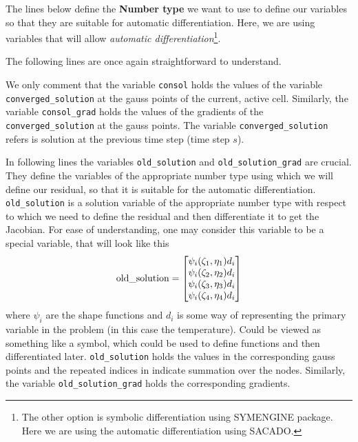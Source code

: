 \documentclass[preprint,12pt]{elsarticle}
\newcommand{\te}[1]{\lstinline{#1}}
\numberwithin{equation}{section}
\begin{document}
The lines below  define the \textbf{Number type} we want to use to define our variables so that they are suitable for automatic differentiation. Here, we are using variables that will allow \textit{automatic differentiation}\footnote{The other option is symbolic differentiation using SYMENGINE package. Here we are using the automatic differentiation using SACADO.}.  


The following lines are once again straightforward to understand. 

We only comment that the variable \te{consol} holds the values of the variable \te{converged_solution} at the gauss points of the current, active cell. Similarly, the variable \te{consol_grad} holds the values of the gradients of the \te{converged_solution} at the gauss points. The variable \te{converged_solution} refers is solution at the previous time step (time step $s$). 


In following lines the variables \te{old_solution} and \te{old_solution_grad} are 
crucial. They define the variables of the  appropriate number type using which we will define our residual, so that it is suitable for the automatic differentiation.  \te{old_solution} is a solution variable of the appropriate number type with respect to which we need to define the residual and then differentiate it to get the Jacobian. For ease of understanding, one may consider this variable to be a special variable, that will look like this
\begin{equation}
	\text{\te{old_solution}} =
	\begin{bmatrix}
		\psi_i (\zeta_1,\eta_1) d_i\\
		\psi_i (\zeta_2,\eta_2) d_i\\
		\psi_i (\zeta_3,\eta_3) d_i\\
		\psi_i (\zeta_4,\eta_4) d_i
		\label{eq:sum}
	\end{bmatrix}
\end{equation} 
where $\psi_i$ are the shape functions and $d_i$ is some way of representing   the primary variable in the problem (in this case the temperature). Could be viewed as something like a symbol, which could be used to define functions and then differentiated later.  \te{old_solution} holds the values in the corresponding gauss points and the repeated indices in  indicate summation over the nodes. Similarly, the variable \te{old_solution_grad} holds the corresponding gradients. 

\end{document}

